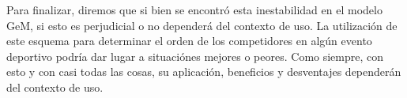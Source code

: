 \par Para finalizar, diremos que si bien se encontr\'o esta inestabilidad en el
modelo GeM, si esto es perjudicial o no depender\'a del contexto de uso. La
utilizaci\'on de este esquema para determinar el orden de los competidores en
alg\'un evento deportivo podr\'ia dar lugar a situaci\'ones mejores o peores.
Como siempre, con esto y con casi todas las cosas, su aplicaci\'on, beneficios y
desventajes dependerán del contexto de uso.
